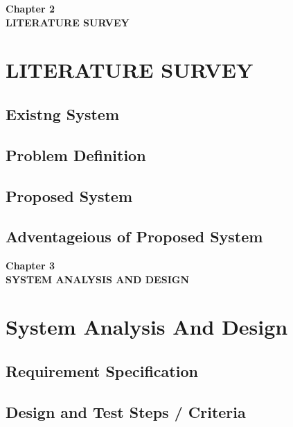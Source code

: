 \documentclass[12pt]{article}
\begin{document}
\begin{center}
 \LARGE \textbf {Chapter 2 }\\[10mm]
 \Large \textbf{LITERATURE SURVEY}\\[10mm]
 \end{center}
 \section{LITERATURE SURVEY}
 \subsection{Existng System}
 \subsection{Problem Definition}
 \subsection{Proposed System}
 \subsection{Adventageious of Proposed System}

\clearpage





\begin{center}
 \LARGE \textbf {Chapter 3 }\\[10mm]
 \Large \textbf{SYSTEM ANALYSIS AND DESIGN}\\[10mm]
 \end{center}
 \section{System Analysis And Design}
 \subsection{Requirement Specification }
 \subsection{Design and Test Steps / Criteria}
\end{document}
